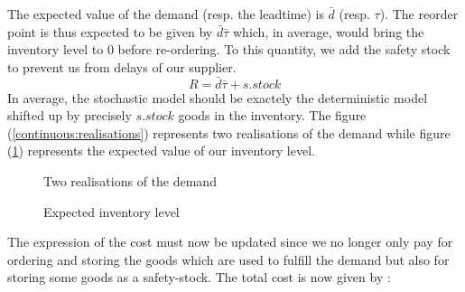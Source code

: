 The expected value of the demand (resp. the leadtime) is $\bar d$ (resp. $\tau$). The reorder point is thus expected to be given by $\bar d\bar\tau$ which, in average, would bring the inventory level to $0$ before re-ordering. To this quantity, we add the safety stock to prevent us from delays of our supplier. \[ R = \bar d\bar \tau + s.stock \] In average, the stochastic model should be exactely the deterministic model shifted up by precisely $s.stock$ goods in the inventory. The figure (\ref{continuous:realisations}) represents two realisations of the demand while figure (\ref{continuous:average}) represents the expected value of our inventory level. 

\begin{figure}[h!]
    \centering
    \caption{\label{continuous:realisations}Two realisations of the demand}
    \caption{\label{continuous:average}Expected inventory level}
\end{figure}

The expression of the cost must now be updated since we no longer only pay for ordering and storing the goods which are used to fulfill the demand but also for storing some goods as a safety-stock. The total cost is now given by : 

